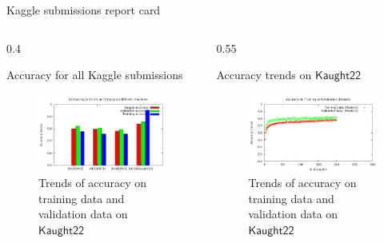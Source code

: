 \documentclass[20pt]{beamer}
\newlength{\twocolwid}
\newcommand*{\K}{\ensuremath{\mathsf{Kaught22}}}
\begin{document}
\begin{frame}[t]
\begin{columns}[t]
\begin{column}{\twocolwid}
\begin{alertblock}{Kaggle submissions report card}
	\begin{columns}[t,totalwidth=\twocolwid] %
		
		
		\begin{column}{0.4\twocolwid} %
		\begin{block}{Accuracy for all Kaggle submissions}
		
		\begin{figure}
				\includegraphics[scale=2.5]{Submissionlogs/KaggleReport.pdf}
				\caption{Trends of accuracy on training data and validation data on $\K$}
		\end{figure}			 
		
		\end{block}	
		\end{column}
		
		
		\hfill
		\begin{column}{0.55\twocolwid}
		\begin{block}{Accuracy trends on $\K$}
		\begin{figure}
		\includegraphics[scale=2.5, page=4]{Submissionlogs/LogAcc.pdf}
		\caption{Trends of accuracy on training data and validation data on $\K$}
		\end{figure}
				

\end{block}
\end{column}
\end{columns}
\end{alertblock}
\end{column}
\end{columns}
\end{frame}
\end{document}
